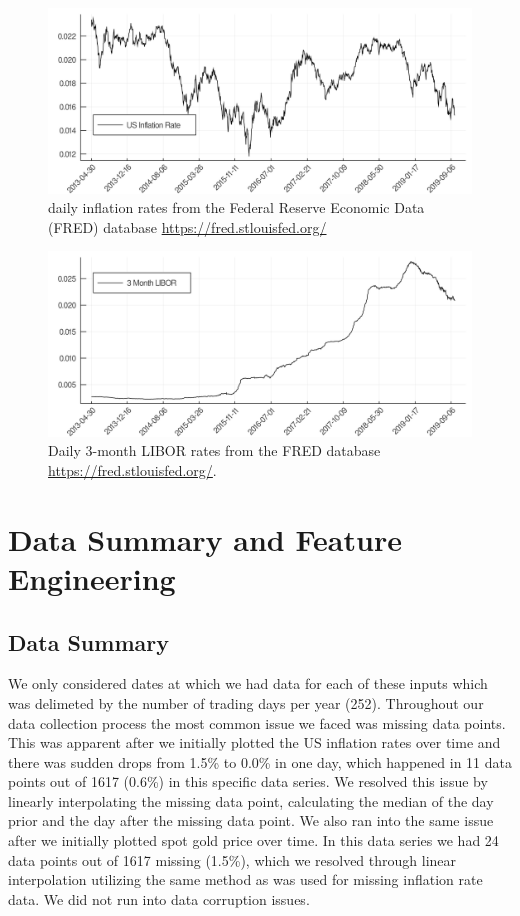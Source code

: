 \documentclass[9pt,twocolumn,twoside]{ilcss}
\begin{document}
\begin{figure}[tbhp]
\centering
\includegraphics[width=.9\linewidth]{US_inflation_rate.png}
\caption{daily inflation rates from the Federal Reserve Economic Data (FRED) database \url{https://fred.stlouisfed.org/}}
\label{fig:2}
\end{figure}

\begin{figure}[tbhp]
\centering
\includegraphics[width=.9\linewidth]{3_month_LIBOR.png}
\caption{Daily 3-month LIBOR rates from the FRED database \url{https://fred.stlouisfed.org/}.}
\label{fig:3}
\end{figure}

\section{Data Summary and Feature Engineering}
\subsection*{Data Summary}
We only considered dates at which we had data for each of these inputs which was delimeted by the number of trading days per year (252). Throughout our data collection process the most common issue we faced was missing data points. This was apparent after we initially plotted the US inflation rates over time and there was sudden drops from 1.5\% to 0.0\% in one day, which happened in 11 data points out of 1617 (0.6\%) in this specific data series. We resolved this issue by linearly interpolating the missing data point, calculating the median of the day prior and the day after the missing data point. We also ran into the same issue after we initially plotted spot gold price over time. In this data series we had 24 data points out of 1617 missing (1.5\%), which we resolved through linear interpolation utilizing the same method as was used for missing inflation rate data. We did not run into data corruption issues.
\end{document}

